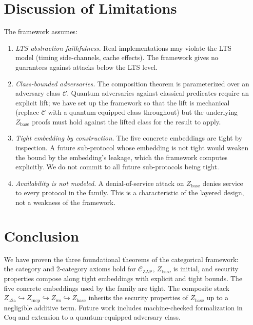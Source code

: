 \documentclass[11pt]{article}
\theoremstyle{definition}
\theoremstyle{remark}
\newcommand{\CZ}{\mathcal{C}_{\mathrm{ZAP}}}
\newcommand{\Zb}{Z_{\mathrm{base}}}
\newcommand{\Zw}{Z_{\mathrm{ws}}}
\newcommand{\Zm}{Z_{\mathrm{mcp}}}
\newcommand{\Za}{Z_{\mathrm{a2a}}}
\begin{document}
\section{Discussion of Limitations}
\label{sec:limits}

The framework assumes:

\begin{enumerate}
\item \emph{LTS abstraction faithfulness.} Real implementations may
violate the LTS model (timing side-channels, cache effects). The
framework gives no guarantees against attacks below the LTS level.
\item \emph{Class-bounded adversaries.} The composition theorem is
parameterized over an adversary class $\mathcal{C}$. Quantum
adversaries against classical predicates require an explicit lift;
we have set up the framework so that the lift is mechanical (replace
$\mathcal{C}$ with a quantum-equipped class throughout) but the
underlying $\Zb$ proofs must hold against the lifted class for the
result to apply.
\item \emph{Tight embedding by construction.} The five concrete
embeddings are tight by inspection. A future sub-protocol whose
embedding is not tight would weaken the bound by the embedding's
leakage, which the framework computes explicitly. We do not commit
to all future sub-protocols being tight.
\item \emph{Availability is not modeled.} A denial-of-service attack
on $\Zb$ denies service to every protocol in the family. This is a
characteristic of the layered design, not a weakness of the
framework.
\end{enumerate}

\section{Conclusion}

We have proven the three foundational theorems of the categorical
framework: the category and 2-category axioms hold for $\CZ$, $\Zb$
is initial, and security properties compose along tight embeddings
with explicit and tight bounds. The five concrete embeddings used
by the family are tight. The composite stack
$\Za \hookrightarrow \Zm \hookrightarrow \Zw \hookrightarrow \Zb$
inherits the security properties of $\Zb$ up to a negligible
additive term. Future work includes machine-checked formalization
in Coq and extension to a quantum-equipped adversary class.

\printbibliography
\end{document}
